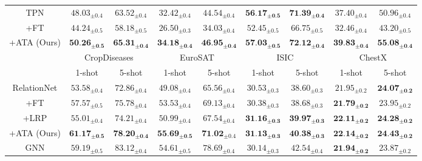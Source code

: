\documentclass{article}
\begin{document}
\begin{table*}[ht]
{\begin{tabular}{ccccccccc}
\hline
TPN             & $48.03_{\pm0.4}$ & $63.52_{\pm0.4}$ & $32.42_{\pm0.4}$ & $44.54_{\pm0.4}$ & $\textbf{56.17}_{\pm\textbf{0.5}}$ & $\textbf{71.39}_{\pm\textbf{0.4}}$ & $37.40_{\pm0.4}$ & $50.96_{\pm0.4}$ \\
+FT \cite{DBLP:conf/iclr/TsengLH020} & $44.24_{\pm0.5}$ & $58.18_{\pm0.5}$ & $26.50_{\pm0.3}$ & $34.03_{\pm0.4}$ & $52.45_{\pm0.5}$ & $66.75_{\pm0.5}$ & $32.46_{\pm0.4}$ & $43.20_{\pm0.5}$ \\
+ATA (Ours) & $\textbf{50.26}_{\pm\textbf{0.5}}$ & $\textbf{65.31}_{\pm\textbf{0.4}}$ & $\textbf{34.18}_{\pm\textbf{0.4}}$ & $\textbf{46.95}_{\pm\textbf{0.4}}$ & $\textbf{57.03}_{\pm\textbf{0.5}}$ & $\textbf{72.12}_{\pm\textbf{0.4}}$ & $\textbf{39.83}_{\pm\textbf{0.4}}$ & $\textbf{55.08}_{\pm\textbf{0.4}}$ \\
\midrule
\multicolumn{1}{c}{\multirow{2}{*}{}}&\multicolumn{2}{c}{CropDiseases}&\multicolumn{2}{c}{EuroSAT}&\multicolumn{2}{c}{ISIC}&\multicolumn{2}{c}{ChestX}
\\ \cmidrule(lr){2-3} \cmidrule(lr){4-5} \cmidrule(lr){6-7} \cmidrule(lr){8-9}
\multicolumn{1}{c}{} & \multicolumn{1}{c}{1-shot}&\multicolumn{1}{c}{5-shot} & \multicolumn{1}{c}{1-shot}&\multicolumn{1}{c}{5-shot} & \multicolumn{1}{c}{1-shot}&\multicolumn{1}{c}{5-shot} & \multicolumn{1}{c}{1-shot}&\multicolumn{1}{c}{5-shot} \\
\hline
RelationNet     & $53.58_{\pm0.4}$ & $72.86_{\pm0.4}$ & $49.08_{\pm0.4}$ & $65.56_{\pm0.4}$ & $30.53_{\pm0.3}$ & $38.60_{\pm0.3}$ & $21.95_{\pm0.2}$ & $\textbf{24.07}_{\pm\textbf{0.2}}$ \\
+FT \cite{DBLP:conf/iclr/TsengLH020}  & $57.57_{\pm0.5}$ & $75.78_{\pm0.4}$ & $53.53_{\pm0.4}$ & $69.13_{\pm0.4}$ & $30.38_{\pm0.3}$ & $38.68_{\pm0.3}$ & $\textbf{21.79}_{\pm\textbf{0.2}}$ & $23.95_{\pm0.2}$ \\
+LRP \cite{sun2020explanation} & $55.01_{\pm0.4}$ & $74.21_{\pm0.4}$ & $50.99_{\pm0.4}$ & $67.54_{\pm0.4}$ & $\textbf{31.16}_{\pm\textbf{0.3}}$ & $\textbf{39.97}_{\pm\textbf{0.3}}$ & $\textbf{22.11}_{\pm\textbf{0.2}}$ & $\textbf{24.28}_{\pm\textbf{0.2}}$ \\
+ATA (Ours) & $\textbf{61.17}_{\pm\textbf{0.5}}$ & $\textbf{78.20}_{\pm\textbf{0.4}}$ & $\textbf{55.69}_{\pm\textbf{0.5}}$ & $\textbf{71.02}_{\pm0.4}$ & $\textbf{31.13}_{\pm\textbf{0.3}}$ & $\textbf{40.38}_{\pm\textbf{0.3}}$ & $\textbf{22.14}_{\pm\textbf{0.2}}$ & $\textbf{24.43}_{\pm\textbf{0.2}}$ \\
\hline
GNN             & $59.19_{\pm0.5}$ & $83.12_{\pm0.4}$ & $54.61_{\pm0.5}$ & $78.69_{\pm0.4}$ & $30.14_{\pm0.3}$ & $42.54_{\pm0.4}$ & $\textbf{21.94}_{\pm\textbf{0.2}}$ & $23.87_{\pm0.2}$ \\

\end{tabular}}
\end{table*}
\end{document}
